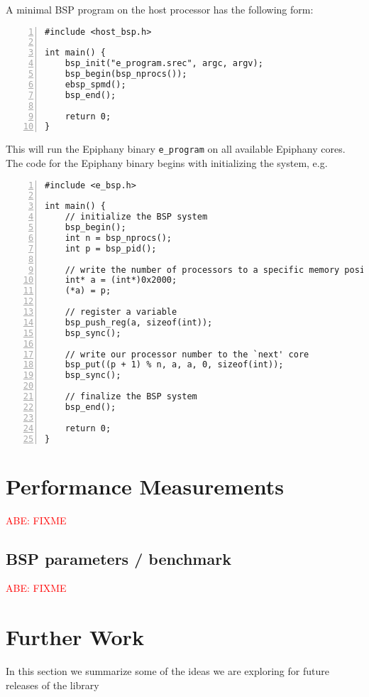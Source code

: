 \documentclass[fleqn]{article}
\renewcommand{\(}{\left(}
\renewcommand{\)}{\right)}
\newcommand{\todo}[1]{\textcolor{red}{#1}}
\begin{document}
A minimal BSP program on the host processor has the following form:
\begin{lstlisting}[numbers = left]
#include <host_bsp.h>

int main() {
    bsp_init("e_program.srec", argc, argv);
    bsp_begin(bsp_nprocs());
    ebsp_spmd();
    bsp_end();

    return 0;
}
\end{lstlisting}
This will run the Epiphany binary \verb.e_program. on all available Epiphany cores. The code for the Epiphany binary begins with initializing the system, e.g.\
\begin{lstlisting}[numbers = left]
#include <e_bsp.h>

int main() {
    // initialize the BSP system
    bsp_begin();
    int n = bsp_nprocs();
    int p = bsp_pid();

    // write the number of processors to a specific memory position
    int* a = (int*)0x2000;
    (*a) = p;

    // register a variable
    bsp_push_reg(a, sizeof(int));
    bsp_sync();

    // write our processor number to the `next' core
    bsp_put((p + 1) % n, a, a, 0, sizeof(int));
    bsp_sync();

    // finalize the BSP system
    bsp_end();

    return 0;
}
\end{lstlisting}
\section{Performance Measurements}

\todo{ABE: FIXME}

\subsection{BSP parameters / benchmark}

\todo{ABE: FIXME}

\section{Further Work}

In this section we summarize some of the ideas we are exploring for future releases of the library
\end{document}
